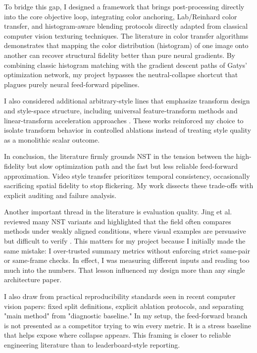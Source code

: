\documentclass[12pt,letterpaper]{article}
\begin{document}
To bridge this gap, I designed a framework that brings post-processing directly into the core objective loop, integrating color anchoring, Lab/Reinhard color transfer, and histogram-aware blending protocols directly adapted from classical computer vision texturing techniques. The literature in color transfer algorithms demonstrates that mapping the color distribution (histogram) of one image onto another can recover structural fidelity better than pure neural gradients. By combining classic histogram matching with the gradient descent paths of Gatys' optimization network, my project bypasses the neutral-collapse shortcut that plagues purely neural feed-forward pipelines.

I also considered additional arbitrary-style lines that emphasize transform design and style-space structure, including universal feature-transform methods and linear-transform acceleration approaches \cite{li2017} \cite{li2018} \cite{ghiasi2017}. These works reinforced my choice to isolate transform behavior in controlled ablations instead of treating style quality as a monolithic scalar outcome.

In conclusion, the literature firmly grounds NST in the tension between the high-fidelity but slow optimization path and the fast but less reliable feed-forward approximation. Video style transfer prioritizes temporal consistency, occasionally sacrificing spatial fidelity to stop flickering. My work dissects these trade-offs with explicit auditing and failure analysis.

Another important thread in the literature is evaluation quality. Jing et al. reviewed many NST variants and highlighted that the field often compares methods under weakly aligned conditions, where visual examples are persuasive but difficult to verify \cite{jing2018review}. This matters for my project because I initially made the same mistake: I over-trusted summary metrics without enforcing strict same-pair or same-frame checks. In effect, I was measuring different inputs and reading too much into the numbers. That lesson influenced my design more than any single architecture paper.

I also draw from practical reproducibility standards seen in recent computer vision papers: fixed split definitions, explicit ablation protocols, and separating "main method" from "diagnostic baseline." In my setup, the feed-forward branch is not presented as a competitor trying to win every metric. It is a stress baseline that helps expose where collapse appears. This framing is closer to reliable engineering literature than to leaderboard-style reporting.
\end{document}
